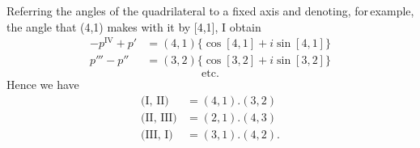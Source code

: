 Referring the angles of the quadrilateral to a fixed axis and denoting, for\,example, the angle that (4,1)
makes with it by [4,1], I obtain
\[
\begin{array}{rl}
-p^{\mathrm{IV}} + p' & = (4,1)\{\cos[4,1] + i\sin[4,1]\} \\
p''' - p'' & = (3,2)\{\cos[3,2] + i\sin[3,2]\}
\end{array}
\]
\[
\text{etc.}
\]
Hence we have
\[
\begin{array}{rl}
\text{(I, II)} & = (4,1) . (3,2) \\
\text{(II, III)} & = (2,1) . (4,3) \\
\text{(III, I)} & = (3,1) . (4,2).
\end{array}
\]
